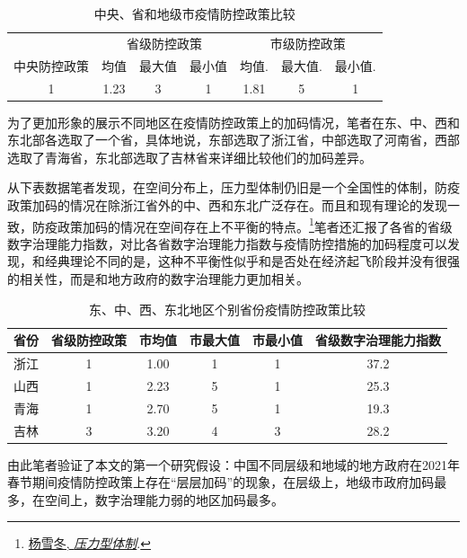 \documentclass[
  12pt,
]{ctexart}
\begin{document}
\begin{table}[!h]

\caption{\label{tab:unnamed-chunk-2}中央、省和地级市疫情防控政策比较}
\centering
\begin{tabular}[t]{ccccccc}
\toprule
\multicolumn{1}{c}{ } & \multicolumn{3}{c}{省级防控政策} & \multicolumn{3}{c}{市级防控政策} \\
\cmidrule(l{3pt}r{3pt}){2-4} \cmidrule(l{3pt}r{3pt}){5-7}
中央防控政策 & 均值 & 最大值 & 最小值 & 均值. & 最大值. & 最小值.\\
\midrule
1 & 1.23 & 3 & 1 & 1.81 & 5 & 1\\
\bottomrule
\end{tabular}
\end{table}

为了更加形象的展示不同地区在疫情防控政策上的加码情况，笔者在东、中、西和东北部各选取了一个省，具体地说，东部选取了浙江省，中部选取了河南省，西部选取了青海省，东北部选取了吉林省来详细比较他们的加码差异。

从下表数据笔者发现，在空间分布上，压力型体制仍旧是一个全国性的体制，防疫政策加码的情况在除浙江省外的中、西和东北广泛存在。而且和现有理论的发现一致，防疫政策加码的情况在空间存在上不平衡的特点。\footnote{\protect\hyperlink{ref-YangXueDong2012}{杨雪冬, \emph{压力型体制}}.}笔者还汇报了各省的省级数字治理能力指数，对比各省数字治理能力指数与疫情防控措施的加码程度可以发现，和经典理论不同的是，这种不平衡性似乎和是否处在经济起飞阶段并没有很强的相关性，而是和地方政府的数字治理能力更加相关。

\begin{table}[!h]

\caption{\label{tab:unnamed-chunk-3}东、中、西、东北地区个别省份疫情防控政策比较}
\centering
\begin{tabular}[t]{cccccc}
\toprule
省份 & 省级防控政策 & 市均值 & 市最大值 & 市最小值 & 省级数字治理能力指数\\
\midrule
浙江 & 1 & 1.00 & 1 & 1 & 37.2\\
山西 & 1 & 2.23 & 5 & 1 & 25.3\\
青海 & 1 & 2.70 & 5 & 1 & 19.3\\
吉林 & 3 & 3.20 & 4 & 3 & 28.2\\
\bottomrule
\end{tabular}
\end{table}

由此笔者验证了本文的第一个研究假设：中国不同层级和地域的地方政府在2021年春节期间疫情防控政策上存在``层层加码''的现象，在层级上，地级市政府加码最多，在空间上，数字治理能力弱的地区加码最多。
\end{document}
